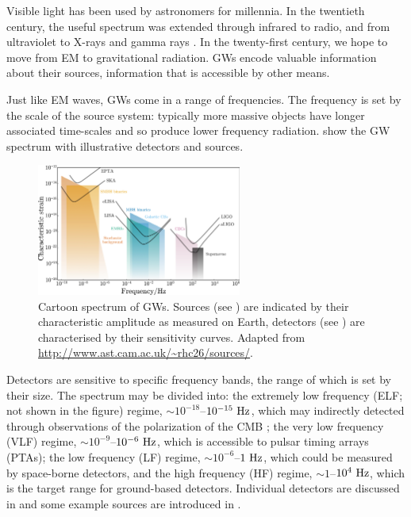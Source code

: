 Visible light has been used by astronomers for millennia. In the twentieth century, the useful spectrum was extended through infrared to radio, and from ultraviolet to X-rays and gamma rays \citep[chapter 7]{Longair2006}. In the twenty-first century, we hope to move from EM to gravitational radiation. GWs encode valuable information about their sources, information that is accessible by other means.

Just like EM waves, GWs come in a range of frequencies. The frequency is set by the scale of the source system: typically more massive objects have longer associated time-scales and so produce lower frequency radiation.  show the GW spectrum with illustrative detectors and sources.
\begin{figure}
  \begin{center}
  \includegraphics[width=0.6\textwidth]{./images/GW_spectrum}
    \caption{Cartoon spectrum of GWs. Sources (see ) are indicated by their characteristic amplitude as measured on Earth, detectors (see ) are characterised by their sensitivity curves. Adapted from \url{http://www.ast.cam.ac.uk/~rhc26/sources/}.}   
    \label{fig:spectrum} 
  \end{center}
\end{figure}
Detectors are sensitive to specific frequency bands, the range of which is set by their size. The spectrum may be divided into: the extremely low frequency (ELF; not shown in the figure) regime, $\sim10^{-18}$--$10^{-15}~\mathrm{Hz}$, which may indirectly detected through observations of the polarization of the CMB \citep[e.g.,][]{Hu1997,Kamionkowski1997}; the very low frequency (VLF) regime, $\sim10^{-9}$--$10^{-6}~\mathrm{Hz}$, which is accessible to pulsar timing arrays (PTAs); the low frequency (LF) regime, $\sim10^{-6}$--$1~\mathrm{Hz}$, which could be measured by space-borne detectors, and the high frequency (HF) regime, $\sim1$--$10^4~\mathrm{Hz}$, which is the target range for ground-based detectors. Individual detectors are discussed in  and some example sources are introduced in .

